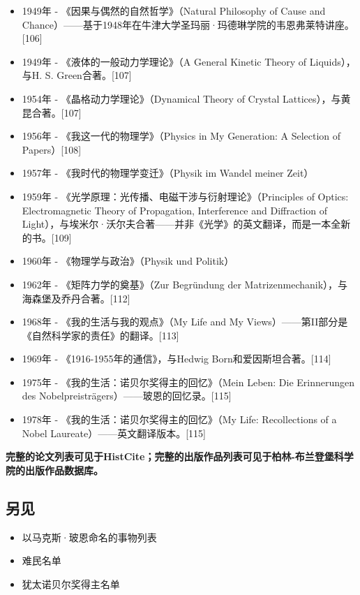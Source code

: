 \begin{itemize}
\item 1949年 - 《因果与偶然的自然哲学》（Natural Philosophy of Cause and Chance）——基于1948年在牛津大学圣玛丽·玛德琳学院的韦恩弗莱特讲座。[106]  
\item 1949年 - 《液体的一般动力学理论》（A General Kinetic Theory of Liquids），与H. S. Green合著。[107]  
\item 1954年 - 《晶格动力学理论》（Dynamical Theory of Crystal Lattices），与黄昆合著。[107]  
\item 1956年 - 《我这一代的物理学》（Physics in My Generation: A Selection of Papers）[108]  
\item 1957年 - 《我时代的物理学变迁》（Physik im Wandel meiner Zeit）  
\item 1959年 - 《光学原理：光传播、电磁干涉与衍射理论》（Principles of Optics: Electromagnetic Theory of Propagation, Interference and Diffraction of Light），与埃米尔·沃尔夫合著——并非《光学》的英文翻译，而是一本全新的书。[109]  
\item 1960年 - 《物理学与政治》（Physik und Politik）  
\item 1962年 - 《矩阵力学的奠基》（Zur Begründung der Matrizenmechanik），与海森堡及乔丹合著。[112]  
\item 1968年 - 《我的生活与我的观点》（My Life and My Views）——第II部分是《自然科学家的责任》的翻译。[113]  
\item 1969年 - 《1916-1955年的通信》，与Hedwig Born和爱因斯坦合著。[114]  
\item 1975年 - 《我的生活：诺贝尔奖得主的回忆》（Mein Leben: Die Erinnerungen des Nobelpreisträgers）——玻恩的回忆录。[115]  
\item 1978年 - 《我的生活：诺贝尔奖得主的回忆》（My Life: Recollections of a Nobel Laureate）——英文翻译版本。[115] 
\end{itemize} 

\textbf{完整的论文列表可见于HistCite；完整的出版作品列表可见于柏林-布兰登堡科学院的出版作品数据库。}
\subsection{另见}  
\begin{itemize}
\item 以马克斯·玻恩命名的事物列表  
\item 难民名单  
\item 犹太诺贝尔奖得主名单  
\end{itemize}
